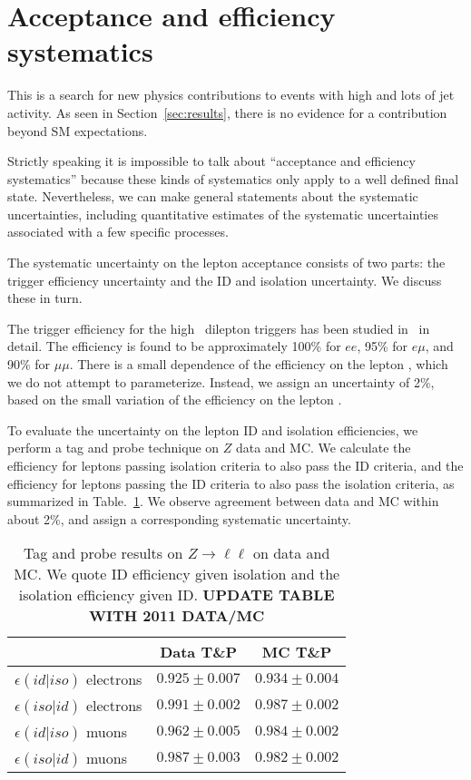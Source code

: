 \section{Acceptance and efficiency systematics}
\label{sec:systematics}

This is a search for new physics contributions to 
events with high \met and lots of jet activity.
As seen in Section~\ref{sec:results}, there is no
evidence for a contribution beyond SM expectations.

Strictly speaking it is impossible to talk about 
``acceptance and efficiency systematics'' because these kinds of
systematics only apply to a well defined final state.
Nevertheless, we can make general statements about the 
systematic uncertainties, including quantitative
estimates of the systematic uncertainties associated with
a few specific processes. 

The systematic uncertainty on the lepton acceptance consists
of two parts: the trigger efficiency uncertainty and the 
ID and isolation uncertainty.  We discuss these in turn.

The trigger efficiency for the high \pt\ dilepton triggers has been studied
in~\cite{ref:HWW} in detail. The efficiency is found to be approximately
100\% for $ee$, 95\% for $e\mu$, and 90\% for $\mu\mu$. There is a small
dependence of the efficiency on the lepton \pt, which we do not attempt
to parameterize. Instead, we assign an uncertainty of 2\%, based on the
small variation of the efficiency on the lepton \pt.

To evaluate the uncertainty on the lepton ID and isolation efficiencies,
we perform a tag and probe technique on $Z$ data and MC. We calculate
the efficiency for leptons passing isolation criteria to also pass
the ID criteria, and the efficiency for leptons passing the ID criteria
to also pass the isolation criteria, as summarized in Table.~\ref{tab:tagandprobe}.
We observe agreement between data and MC within about 2\%, and assign 
a corresponding systematic uncertainty.

\begin{table}[hbt]
\begin{center}
\caption{\label{tab:tagandprobe} Tag and probe results on $Z \to \ell \ell$
on data and MC.  We quote ID efficiency given isolation and 
the isolation efficiency given ID. {\bf UPDATE TABLE WITH 2011 DATA/MC}}
\begin{tabular}{|l||c|c|}
\hline
                             & Data  T\&P      & MC T\&P             \\  
\hline
$\epsilon(id|iso)$ electrons & $0.925 \pm 0.007$ & $0.934 \pm 0.004$ \\
$\epsilon(iso|id)$ electrons & $0.991 \pm 0.002$ & $0.987 \pm 0.002$ \\
$\epsilon(id|iso)$ muons     & $0.962 \pm 0.005$ & $0.984 \pm 0.002$ \\
$\epsilon(iso|id)$ muons     & $0.987 \pm 0.003$ & $0.982 \pm 0.002$ \\ 
\hline
\end{tabular}
\end{center}
\end{table}

